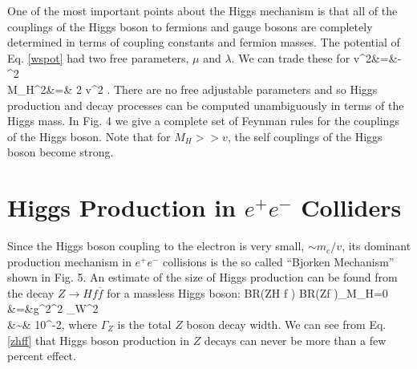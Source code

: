 One of the most important points about the Higgs mechanism is
that all of the couplings of the Higgs boson to fermions and
gauge bosons are completely determined in terms of coupling
constants and fermion masses. The potential of Eq. \ref{wspot}
had two free parameters, $\mu$ and $\lambda$.  We can trade
these for
\beqn
v^2&=&-{\mu^2 \lambda}\nonumber \\
M_H^2&=& 2 v^2 \lambda.
\eeqn
  There are no free adjustable
parameters and so Higgs production  and decay processes
can be computed unambiguously in terms of the Higgs mass.  In Fig. 4
we give a complete set  of Feynman rules for the couplings of the
Higgs boson.  Note that for $M_H>>v$, the self couplings of the Higgs
boson become strong.

\section{Higgs Production in $e^+ e^-$ Colliders}

Since the Higgs boson coupling to the electron is very
small, $\sim m_e/v$, its dominant production mechanism in
$e^+e^-$ collisions is the so called ``Bjorken Mechanism''
shown in Fig. 5.\cite{bj}
An estimate of the size of Higgs production can be found from
the decay $Z\rightarrow H f {\overline f}$ for a massless Higgs boson:
\beqn
{BR(Z\rightarrow H f )\over
BR(Z\rightarrow f )}\mid_{M_H=0}
&=&{g^2\pi^2 \cos \theta_W^2}
\nonumber \\
&\sim& 10^{-2},
\label{zhff}
\eeqn
where $\Gamma_Z$ is the total $Z$ boson decay width.
We can see from Eq. \ref{zhff}
that Higgs boson production in $Z$ decays
can never be more than a few percent effect.

